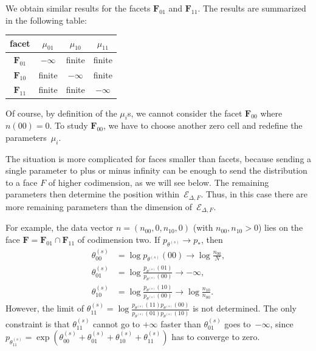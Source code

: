 \documentclass[aos,noinfoline]{imsart}
\newcommand{\Ecal}{\mathcal{E}}
\newcommand{\Fbf}{\mathbf{F}}
\newcommand{\gmle}{p_{*}}
\theoremstyle{remark}
\theoremstyle{definition}
\begin{document}
We obtain similar results for the facets $\Fbf_{01}$ and $\Fbf_{11}$. The results are summarized in the following table:
\begin{center} %
  \begin{tabular}{cccc}
    \hline
    facet & $\mu_{01}$ & $\mu_{10}$ & $\mu_{11}$ \\
    \hline
    $\mathbf{F}_{01}$ &  $-\infty$ & finite & finite \\
    $\mathbf{F}_{10}$ &  finite & $-\infty$ & finite \\
    $\mathbf{F}_{11}$ &  finite & finite & $-\infty$ \\
    \hline
  \end{tabular}
\end{center}
Of course, by definition of the $\mu_i$s, we cannot consider the facet $\mathbf{F}_{00}$ where $n(00)=0$.  To study
$\mathbf{F}_{00}$, we have to choose another zero cell and redefine the parameters~$\mu_{i}$.

The situation is more complicated for faces smaller than facets, because sending a single parameter to plus
or minus infinity can be enough to send the distribution to a face $F$ of higher codimension, as we will see below.  The
remaining parameters then determine the position within~$\Ecal_{\Delta,F}$.  Thus, in this case there are more remaining
parameters than the dimension of~$\Ecal_{\Delta,F}$.

  For example, the data vector $n=(n_{00},0,n_{10},0)$ (with $n_{00},n_{10}>0$) lies on the face
  $\Fbf=\Fbf_{01}\cap\Fbf_{11}$ of codimension two.  If $p_{\theta^{(s)}}\to\gmle$, then
  \begin{align*}
    \theta^{(s)}_{00} &= \log p_{\theta^{(s)}}(00) \to \log\frac{n_{00}}{N}, \\
    \theta^{(s)}_{01} &= \log \frac{p_{\theta^{(s)}}(01)}{p_{\theta^{(s)}}(00)} \to -\infty, \\
    \theta^{(s)}_{10} &= \log \frac{p_{\theta^{(s)}}(10)}{p_{\theta^{(s)}}(00)} \to \log\frac{n_{10}}{n_{00}}.
  \end{align*}
  However, the limit of
  $\theta^{(s)}_{11}=\log\frac{p_{\theta^{(s)}}(11)p_{\theta^{(s)}}(00)}{p_{\theta^{(s)}}(01)p_{\theta^{(s)}}(10)}$ is
  not determined.  The only constraint is that $\theta^{(s)}_{11}$ cannot go to $+\infty$ faster than
  $\theta^{(s)}_{01}$ goes to~$-\infty$, since
  $p_{\theta^{(s)}_{11}}=\exp(\theta^{(s)}_{00}+\theta^{(s)}_{01}+\theta^{(s)}_{10}+\theta^{(s)}_{11})$ has to converge
  to zero.
\end{document}
